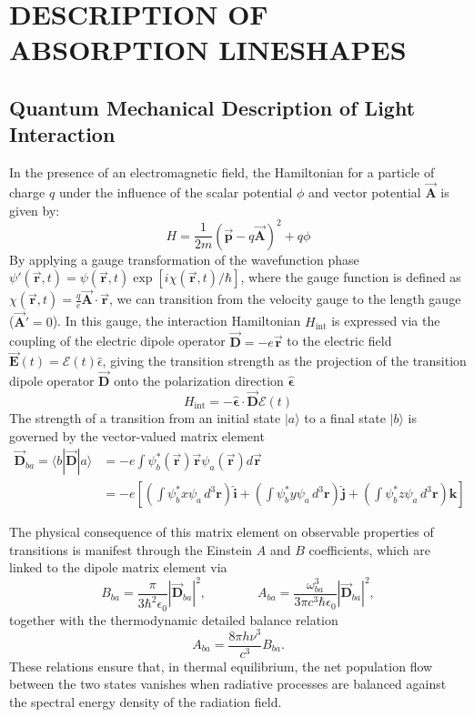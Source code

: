 \documentclass[12pt]{report}
\def\rvec{\vec{\mathbf{r}}}
\def\Avec{\vec{\mathbf{A}}}
\begin{document}
	\chapter{DESCRIPTION OF ABSORPTION LINESHAPES}\label{chap:lineshapes}

	\section{Quantum Mechanical Description of Light Interaction}
	In the presence of an electromagnetic field, the Hamiltonian for a particle of charge $q$ under the influence of the scalar potential $\phi$ and vector potential $\Avec$ is given by:
	$$H = \frac{1}{2m}(\vec{\mathbf{p}} - q\Avec)^2 + q \phi$$
	By applying a gauge transformation of the wavefunction phase $\psi'(\rvec,t) = \psi(\rvec,t)\exp[i\chi(\rvec,t)/\hbar]$, where the gauge function is defined as $\chi(\rvec,t) = \frac{q}{e}\Avec \cdot \rvec$, we can transition from the velocity gauge to the length gauge ($\Avec'=0$). In this gauge, the interaction Hamiltonian $H_\mathrm{int}$ is expressed via the coupling of the electric dipole operator $\vec{\mathbf{D}} = - e\rvec$ to the electric field $\vec{\mathbf{E}}(t) = \mathcal{E}(t)\hat{\epsilon}$, giving the transition strength as the projection of the transition dipole operator $\vec{\mathbf{D}}$ onto the polarization direction $\mathbf{\hat{\epsilon}}$
	\begin{equation} \label{interaction_hamiltonian}
		H_\mathrm{int} = -\mathbf{\hat{\epsilon}} \cdot \vec{\mathbf{D}} \mathcal{E}(t)
	\end{equation}
	The strength of a transition from an initial state $|a\rangle$ to a final state $|b\rangle$ is governed by the vector-valued matrix element
	\begin{align}\label{dipoleElement}
		\vec{\mathbf{D}}_{ba} = \langle b|\vec{\mathbf{D}}|a\rangle
		&= -e\int\psi_b^*(\rvec)\rvec\psi_a(\rvec)d\rvec \nonumber\\
		&= -e \left[ \left( \int \psi_b^* x \psi_a \, d^3\mathbf{r} \right) \mathbf{\hat{i}} + \left( \int \psi_b^* y \psi_a \, d^3\mathbf{r} \right) \mathbf{\hat{j}} + \left( \int \psi_b^* z \psi_a \, d^3\mathbf{r} \right) \mathbf{\hat{k}} \right]
	\end{align}
	
	The physical consequence of this matrix element on observable properties of transitions is manifest through the Einstein $A$ and $B$ coefficients, which are linked to the dipole matrix element via	
	\begin{equation} \label{einstein_link}
		B_{ba} = \frac{\pi}{3\hbar^2 \epsilon_0} \left| \vec{\mathbf{D}}_{ba} \right|^2,
		\qquad\qquad
		A_{ba} = \frac{\omega_{ba}^3}{3\pi c^3 \hbar \epsilon_0} \left| \vec{\mathbf{D}}_{ba} \right|^2,
	\end{equation}
	together with the thermodynamic detailed balance relation
	\begin{equation} \label{einstein_balance}
		A_{ba} = \frac{8\pi h \nu^3}{c^3} B_{ba}.
	\end{equation}
	These relations ensure that, in thermal equilibrium, the net population flow between the two states vanishes when radiative processes are balanced against the spectral energy density of the radiation field.
	
\end{document}
